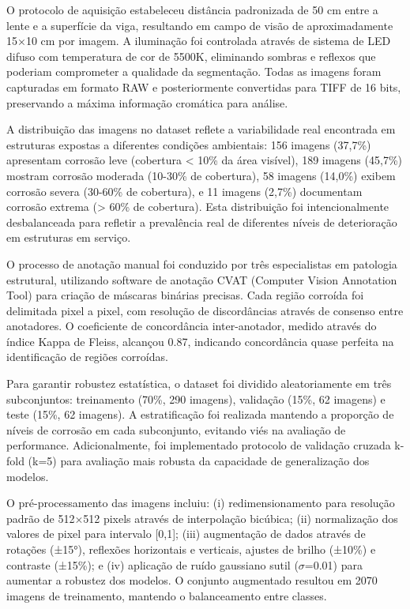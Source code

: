 \documentclass[12pt,a4paper,twoside]{article}
\begin{document}
O protocolo de aquisição estabeleceu distância padronizada de 50 cm entre a lente e a superfície da viga, resultando em campo de visão de aproximadamente 15×10 cm por imagem. A iluminação foi controlada através de sistema de LED difuso com temperatura de cor de 5500K, eliminando sombras e reflexos que poderiam comprometer a qualidade da segmentação. Todas as imagens foram capturadas em formato RAW e posteriormente convertidas para TIFF de 16 bits, preservando a máxima informação cromática para análise.

A distribuição das imagens no dataset reflete a variabilidade real encontrada em estruturas expostas a diferentes condições ambientais: 156 imagens (37,7\%) apresentam corrosão leve (cobertura < 10\% da área visível), 189 imagens (45,7\%) mostram corrosão moderada (10-30\% de cobertura), 58 imagens (14,0\%) exibem corrosão severa (30-60\% de cobertura), e 11 imagens (2,7\%) documentam corrosão extrema (> 60\% de cobertura). Esta distribuição foi intencionalmente desbalanceada para refletir a prevalência real de diferentes níveis de deterioração em estruturas em serviço.

O processo de anotação manual foi conduzido por três especialistas em patologia estrutural, utilizando software de anotação CVAT (Computer Vision Annotation Tool) para criação de máscaras binárias precisas. Cada região corroída foi delimitada pixel a pixel, com resolução de discordâncias através de consenso entre anotadores. O coeficiente de concordância inter-anotador, medido através do índice Kappa de Fleiss, alcançou 0.87, indicando concordância quase perfeita na identificação de regiões corroídas.

Para garantir robustez estatística, o dataset foi dividido aleatoriamente em três subconjuntos: treinamento (70\%, 290 imagens), validação (15\%, 62 imagens) e teste (15\%, 62 imagens). A estratificação foi realizada mantendo a proporção de níveis de corrosão em cada subconjunto, evitando viés na avaliação de performance. Adicionalmente, foi implementado protocolo de validação cruzada k-fold (k=5) para avaliação mais robusta da capacidade de generalização dos modelos.

O pré-processamento das imagens incluiu: (i) redimensionamento para resolução padrão de 512×512 pixels através de interpolação bicúbica; (ii) normalização dos valores de pixel para intervalo [0,1]; (iii) augmentação de dados através de rotações (±15°), reflexões horizontais e verticais, ajustes de brilho (±10\%) e contraste (±15\%); e (iv) aplicação de ruído gaussiano sutil ($\sigma$=0.01) para aumentar a robustez dos modelos. O conjunto augmentado resultou em 2070 imagens de treinamento, mantendo o balanceamento entre classes.
\end{document}
